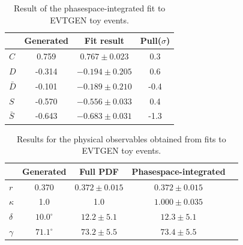 \begin{table}[h]
\caption{Result of the phasespace-integrated fit to \textsf{EVTGEN} toy events.} 		
  \centering
  \begin{tabular}
    {l c c c}
    \hline \hline
    & Generated &  Fit result  & Pull($\sigma$) \\   \hline
    $C$ & 0.759  &  $0.767 \pm 0.023 $  & 0.3         \\
    $D$ &  -0.314 &  $-0.194 \pm 0.205$ & 0.6         \\
    $\bar D$ &  -0.101 &  $-0.189 \pm 0.210$ & -0.4   \\
    $S$ &   -0.570 &  $-0.556 \pm 0.033$     & 0.4 \\
    $\bar S$ &  -0.643   &  $-0.683\pm 0.031$ & -1.3  \\
    \hline \hline
  \end{tabular}
    \label{tab:FitGenMC}
\end{table}


\begin{table}[h]
\caption{Results for the physical observables obtained from fits to \textsf{EVTGEN} toy events.} 		
  \centering
  \begin{tabular}
    {l c c c c}
    \hline \hline
    & Generated &  Full PDF     &   Phasespace-integrated  \\   \hline
 $r$ & 0.370 & $0.372 \pm 0.015 $ & $0.372 \pm 0.015$  \\
 $\kappa$  &1.0 & 1.0 &  $1.000 \pm  0.035$  \\
 $\delta$ & $10.0^\circ$ &  $12.2 \pm  5.1$ & $12.3 \pm  5.1$   \\
 $\gamma$ & $71.1^\circ$ &   $73.2 \pm 5.5$ &  $73.4 \pm 5.5$\\
    \hline \hline
  \end{tabular}
      \label{tab:FitGenMC3}
\end{table}


